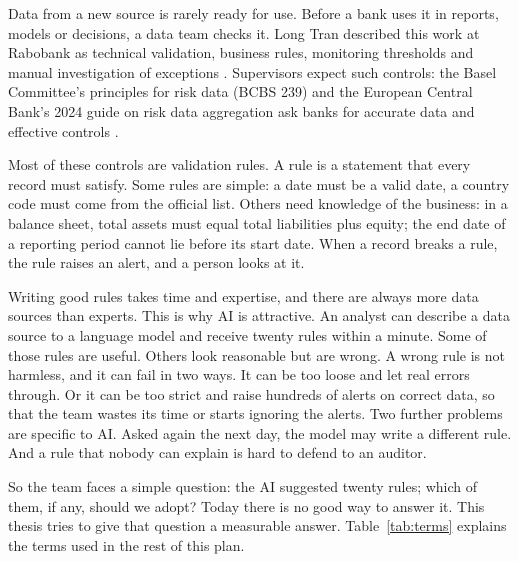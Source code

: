 \documentclass[11pt,a4paper]{article}
\begin{document}
Data from a new source is rarely ready for use. Before a bank uses it in reports, models or decisions, a data team checks it. Long Tran described this work at Rabobank as technical validation, business rules, monitoring thresholds and manual investigation of exceptions \cite{tran}. Supervisors expect such controls: the Basel Committee's principles for risk data (BCBS 239) and the European Central Bank's 2024 guide on risk data aggregation ask banks for accurate data and effective controls \cite{bcbs239,ecbrdarr}.

Most of these controls are validation rules. A rule is a statement that every record must satisfy. Some rules are simple: a date must be a valid date, a country code must come from the official list. Others need knowledge of the business: in a balance sheet, total assets must equal total liabilities plus equity; the end date of a reporting period cannot lie before its start date. When a record breaks a rule, the rule raises an alert, and a person looks at it.

Writing good rules takes time and expertise, and there are always more data sources than experts. This is why AI is attractive. An analyst can describe a data source to a language model and receive twenty rules within a minute. Some of those rules are useful. Others look reasonable but are wrong. A wrong rule is not harmless, and it can fail in two ways. It can be too loose and let real errors through. Or it can be too strict and raise hundreds of alerts on correct data, so that the team wastes its time or starts ignoring the alerts. Two further problems are specific to AI. Asked again the next day, the model may write a different rule. And a rule that nobody can explain is hard to defend to an auditor.

So the team faces a simple question: the AI suggested twenty rules; which of them, if any, should we adopt? Today there is no good way to answer it. This thesis tries to give that question a measurable answer. Table~\ref{tab:terms} explains the terms used in the rest of this plan.
\end{document}
